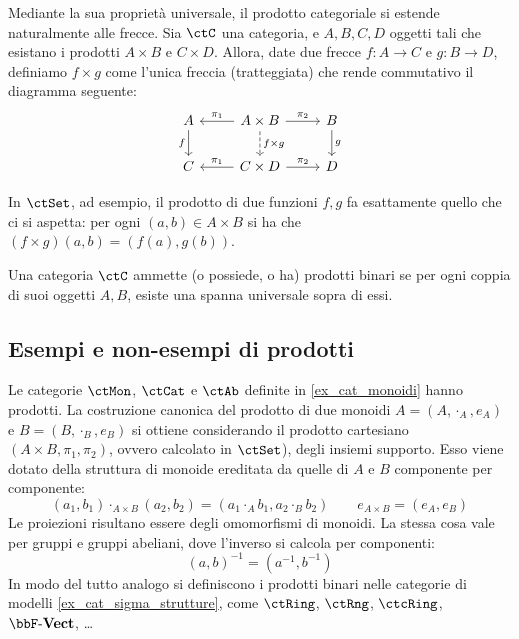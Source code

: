 \medskip
Mediante la sua proprietà universale, il prodotto categoriale si estende naturalmente alle frecce. Sia \(\ctC\) una categoria, e \(A,B,C,D\) oggetti tali che esistano i prodotti \(A\times B\) e \(C\times D\). Allora, date due frecce \(f\colon A\to C\) e \(g\colon B\to D\), definiamo \(f\times g\) come l'unica freccia (tratteggiata) che rende commutativo il diagramma seguente:
\begin{equation}
	\begin{aligned}
		\begin{tikzcd}
			A\ar[d, "f"']&A\times B\ar[l, "\pi_1"']\ar[r, "\pi_2"]\ar[d, "f\times g", dashed]&B\ar[d, "g"]
			\\
			C&C\times D\ar[l, "\pi_1"']\ar[r, "\pi_2"]&D
		\end{tikzcd}
	\end{aligned}
\end{equation}

In \(\ctSet\), ad esempio, il prodotto di due funzioni \(f,g\) fa esattamente quello che ci si aspetta: per ogni \((a,b)\in A\times B\) si ha che \((f\times g)(a,b)=(f(a),g(b))\).

\begin{definition}\label{def_cat_con_prodotti}
	Una categoria \(\ctC\) ammette (o possiede, o ha) prodotti binari se per ogni coppia di suoi oggetti \(A,B\), esiste una spanna universale sopra di essi.
\end{definition}

\subsection{Esempi e non-esempi di prodotti}
\begin{example}
	Le categorie \(\ctMon\), \(\ctCat\) e \(\ctAb\) definite in \ref{ex_cat_monoidi} hanno prodotti. La costruzione canonica del prodotto di due monoidi \(A=(A, \cdot_A, e_A)\) e \(B=(B, \cdot_B, e_B)\)   si ottiene considerando il prodotto cartesiano \((A\times B,\pi_1, \pi_2)\), ovvero calcolato in \(\ctSet\)), degli insiemi supporto. Esso viene dotato della struttura di monoide ereditata da quelle di \(A\) e \(B\) componente per componente:
	\[
		(a_1,b_1)\cdot_{A \times B} (a_2,b_2)=(a_1\cdot_A b_1, a_2\cdot_B b_2)\qquad e_{A\times B}=(e_A,e_B)
	\]
	Le proiezioni risultano essere degli omomorfismi di monoidi.
	La stessa cosa vale per gruppi e gruppi abeliani, dove l'inverso si calcola per componenti:
	\[
		(a,b)^{-1}=(a^{-1},b^{-1})
	\]
	In modo del tutto analogo si definiscono i prodotti binari nelle categorie di modelli  \ref{ex_cat_sigma_strutture}, come \(\ctRing\), \(\ctRng\), \(\ctcRing\), \(\ctVect\), \dots
\end{example}


